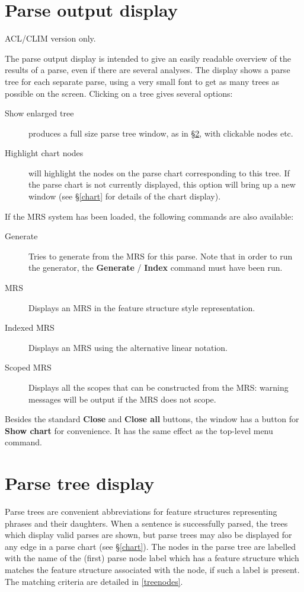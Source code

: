 \documentclass[12pt]{report}
\newcommand{\lkbmenucommand}{\bf}
\begin{document}
\section{Parse output display}
\label{parseout}

ACL/CLIM version only.

The parse output display is intended to give an easily readable
overview of the results of a parse, even if there are several
analyses.  The display shows a parse tree for each separate
parse, using a very small font to get as many trees as possible on
the screen.  Clicking on a tree gives several options:
\begin{description}
\item[Show enlarged tree] produces a full size parse tree window, as
in \S\ref{parsetree}, with clickable nodes etc.
\item[Highlight chart nodes] will highlight the nodes on the 
parse chart corresponding to this tree.  If the parse chart is not currently
displayed, this option will bring up a new window (see \S\ref{chart}
for details of the chart display).
\end{description}
If the MRS system has been loaded, the following commands are also available:
\begin{description}
\item[Generate] Tries to generate from the MRS for this parse.  Note that
in order to run the generator, the {\lkbmenucommand Generate} / {\lkbmenucommand Index}
command must have been run.
\item[MRS] Displays an MRS in the feature structure style representation.
\item[Indexed MRS] Displays an MRS using the alternative linear notation. 
\item[Scoped MRS] Displays all the scopes that can be constructed from the MRS:
warning messages will be output if the MRS does not scope.
\end{description}


Besides the standard {\lkbmenucommand Close} and {\lkbmenucommand Close all} buttons,
the window has a button for {\lkbmenucommand Show chart} for convenience.
It has the same effect as the top-level menu command.


\section{Parse tree display}
\label{parsetree}

Parse trees are convenient abbreviations for feature structures 
representing phrases and their
daughters.  When a sentence is successfully
parsed, the trees which display valid
parses are shown, but parse trees may also be displayed for any edge in 
a parse chart (see \S\ref{chart}).
The nodes in the parse tree are labelled with the name of the 
(first) parse node label which has a feature structure which matches 
the feature structure associated with the node, if such a label 
is present.  The matching criteria are detailed in \ref{treenodes}.  
\end{document}
